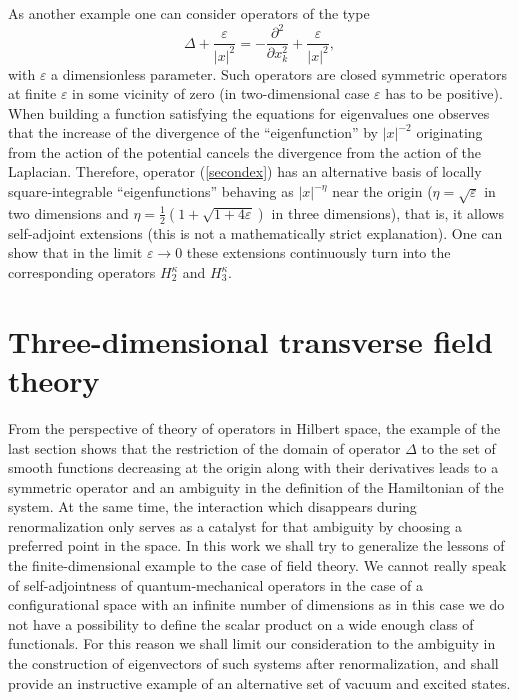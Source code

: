 \documentclass[12pt]{article}
\newcommand{\ve}{\varepsilon}
\begin{document}
	As another example one can consider operators of the type
\begin{equation}
\label{secondex}
    \Delta + \frac{\ve}{|x|^{2}} =
	-\frac{\partial^{2}}{\partial x_{k}^{2}} + \frac{\ve}{|x|^{2}},
\end{equation}
	with
$ \ve $ a dimensionless parameter.
	Such operators are closed symmetric operators at finite
$ \ve $
	in some vicinity of zero (in two-dimensional case
$ \ve $ has to be positive).
	When building a function satisfying the equations for eigenvalues
	one observes that the increase of the divergence of the ``eigenfunction'' by
$ |x|^{-2} $
	originating from the action of the potential cancels the
	divergence from the action of the Laplacian.
	Therefore, operator
(\ref{secondex})
	has an alternative basis of locally square-integrable
	``eigenfunctions'' behaving as
$ |x|^{-\eta} $
	near the origin
($ \eta = \sqrt{\ve} $ in two dimensions and
$ \eta = \frac{1}{2}(1+\sqrt{1+4\ve}) $ in three dimensions),
	that is, it allows self-adjoint extensions
	(this is not a mathematically strict explanation).
	One can show that in the limit
$ \ve \to 0 $
	these extensions continuously turn into the corresponding operators
$ H_{2}^{\kappa} $ and
$ H_{3}^{\kappa} $.




\section{Three-dimensional transverse field theory}
	From the perspective of theory of operators in Hilbert space,
	the example of the last section shows that the restriction of the
	domain of operator
$ \Delta $
	to the set of smooth functions decreasing at the origin along with their derivatives
	leads to a symmetric operator and an ambiguity in the definition
	of the Hamiltonian of the system.
	At the same time, the interaction which disappears during renormalization
	only serves as a catalyst for that ambiguity by choosing a preferred point in the space.
	In this work we shall try to generalize the lessons of the finite-dimensional example
	to the case of field theory.
	We cannot really speak of self-adjointness of quantum-mechanical operators
	in the case of a configurational space with an infinite number of dimensions
	as in this case we do not have a possibility to define the scalar product
	on a wide enough class of functionals.
	For this reason we shall limit our consideration to the ambiguity
	in the construction of eigenvectors of such systems after renormalization,
	and shall provide an instructive example of an alternative set
	of vacuum and excited states.
\end{document}
